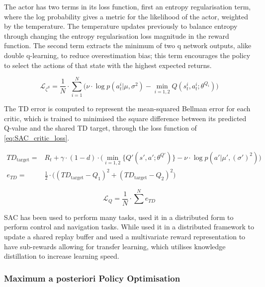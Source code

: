 The actor has two terms in its loss function, first an entropy regularisation term, where the log probability gives a metric for the likelihood of the actor, weighted by the temperature. The temperature updates previously to balance entropy through changing the entropy regularisation loss magnitude in the reward function. The second term extracts the minimum of two q network outputs, alike double q-learning, to reduce overestimation bias; this term encourages the policy to select the actions of that state with the highest expected returns.

\begin{equation}
    \mathcal{L}_{\zeta^S} = \frac{1}{N} \cdot \sum^N_{i=1} \bigg(\nu \cdot \log p(a_t^i|\mu, \sigma^2) - \min_{i=1,2}Q(s_t^i,a_t^i;\theta^{Q_i})\bigg)
\label{eq:SAC_actorloss}
\end{equation}

The TD error is computed to represent the mean-squared Bellman error for each critic, which is trained to minimised the square difference between its predicted Q-value and the shared TD target, through the loss function of \autoref{eq:SAC_critic_loss}.

\begin{equation}
\begin{aligned}
    TD_{\text{target}} =& R_t + \gamma \cdot (1-d) \cdot \bigg(\min_{i=1,2} \{Q'(s',a';\theta^{Q'})\}- \nu \cdot \log p(a'|\mu',(\sigma')^2)\bigg) \\
    e_{TD} =& \frac{1}{2} \cdot \bigg((TD_{\text{target}} - Q_1)^2 + (TD_{\text{target}} - Q_2)^2\bigg)
\end{aligned}
\label{eq:TD_error_entropy_regularised}
\end{equation}

\begin{equation}
    \mathcal{L}_Q = \frac{1}{N} \cdot \sum^N e_{TD}
\label{eq:SAC_critic_loss}
\end{equation}

SAC has been used to perform many tasks, \cite{wahid2020learning} used it in a distributed form to perform control and navigation tasks. While \cite{akimov2019distributed} used it in a distributed framework to update a shared replay buffer and used a multivariate reward representation to have sub-rewards allowing for transfer learning, which utilises knowledge distillation to increase learning speed.

\subsubsection{Maximum a posteriori Policy Optimisation}
\label{sec:MPO}

